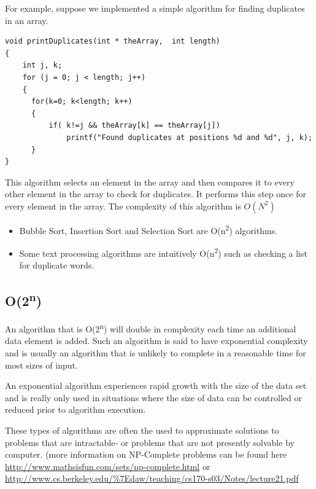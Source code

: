 For example,  suppose we implemented a simple algorithm for finding duplicates in an array.     

\begin{lstlisting}
void printDuplicates(int * theArray,  int length)
{
    int j, k;
    for (j = 0; j < length; j++)
    {
      for(k=0; k<length; k++)
      {
          if( k!=j && theArray[k] == theArray[j])
              printf("Found duplicates at positions %d and %d", j, k);
      }
}
\end{lstlisting}

This algorithm selects an element in the array and then compares it to every other element in the array to check for duplicates.  It performs this step once for every element in the array.     The complexity of this algorithm is $O(N^2)$

\begin{itemize}

\item Bubble Sort, Insertion Sort and Selection Sort are O(n\textsuperscript{2}) algorithms.\\
\item  Some text processing algorithms are intuitively  O(n\textsuperscript{2}) such as checking a list for duplicate words.
\end{itemize}



\subsection {O(2\textsuperscript{n})}

An algorithm that is O(2\textsuperscript{n}) will double in
complexity each time an additional data element is added. Such an
algorithm is said to have exponential complexity and is usually an
algorithm that is unlikely to complete in a reasonable time for most
sizes of input.

An exponential algorithm experiences rapid growth with
the size of the data set and is really only used in situations where the
size of data can be controlled or reduced prior to algorithm execution.

These types of algorithms are often the used to approximate solutions to
problems that are intractable- or problems that are not presently
solvable by computer. (more information on NP-Complete problems can be
found here \url{http://www.mathsisfun.com/sets/np-complete.html} or
\url{http://www.cs.berkeley.edu/\%7Edaw/teaching/cs170-s03/Notes/lecture21.pdf}

